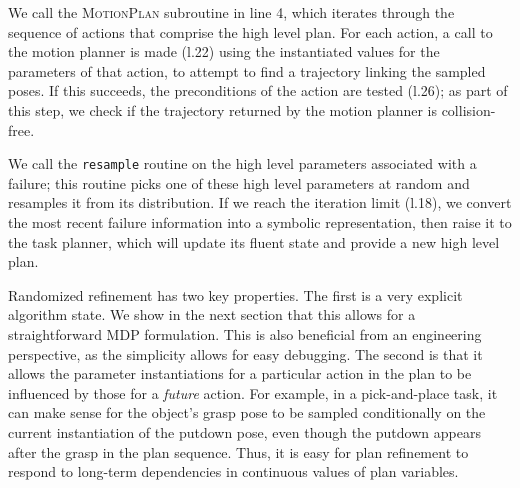 We call the \textsc{MotionPlan} subroutine in line 4, which
iterates through the sequence of actions that comprise the high level plan.
For each action, a call to the motion planner is made (l.22) using the instantiated values
for the parameters of that action, to attempt to find a trajectory
linking the sampled poses. If this succeeds, the preconditions of the action
are tested (l.26); as part of this step, we check if the trajectory returned by the
motion planner is collision-free.

We call the \texttt{resample} routine on the high level parameters
associated with a failure; this routine picks one of these high level parameters at random and
resamples it from its distribution. If we reach the iteration limit (l.18),
we convert the most recent failure information into a symbolic representation, then raise it
to the task planner, which will update its fluent state and provide a new
high level plan.

Randomized refinement has two key properties. The first is a very explicit algorithm state.
We show in the next section that this allows for a straightforward MDP
formulation. This is also beneficial from an
engineering perspective, as the simplicity allows for easy debugging. The second is that
 it allows the parameter instantiations for a particular action in
the plan to be influenced by those for a \emph{future} action. For example, in a
pick-and-place task, it can make sense for the object's grasp pose to be sampled
conditionally on the current instantiation of the putdown pose, even though the putdown
appears after the grasp in the plan sequence. Thus, it is easy for plan refinement to
respond to long-term dependencies in continuous values of plan variables.